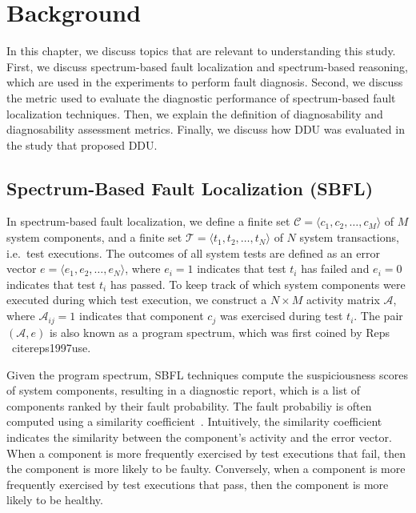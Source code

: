 \documentclass[twoside,a4paper,11pt]{memoir}
\begin{document}
\chapter{Background}%
\label{ch:background}

In this chapter, we discuss topics that are relevant to understanding this study.
First, we discuss spectrum-based fault localization and spectrum-based reasoning, which are used in the experiments to perform fault diagnosis.
Second, we discuss the metric used to evaluate the diagnostic performance of spectrum-based fault localization techniques.
Then, we explain the definition of diagnosability and diagnosability assessment metrics.
Finally, we discuss how DDU was evaluated in the study that proposed DDU\@.

\section{Spectrum-Based Fault Localization (SBFL)}
In spectrum-based fault localization, we define a finite set \(\mathcal{C} = \langle c_1, c_2, \ldots, c_M \rangle \) of \(M\) system components, and a finite set \(\mathcal{T} = \langle t_1, t_2, \ldots, t_N \rangle \) of \(N\) system transactions, i.e.\ test executions.
The outcomes of all system tests are defined as an error vector \(e = \langle e_1, e_2, \ldots, e_N \rangle \), where \(e_i = 1 \) indicates that test \(t_i \) has failed and \(e_i = 0 \) indicates that test \(t_i \) has passed.
To keep track of which system components were executed during which test execution, we construct a \(N \times M \) activity matrix \(\mathcal{A} \), where \(\mathcal{A}_{ij} = 1 \) indicates that component \(c_j \) was exercised during test \(t_i \).
The pair \((\mathcal{A}, e) \) is also known as a program spectrum, which was first coined by Reps \etal~cite{reps1997use}.

Given the program spectrum, SBFL techniques compute the suspiciousness scores of system components, resulting in a diagnostic report, which is a list of components ranked by their fault probability.
The fault probabiliy is often computed using a similarity coefficient~\cite{Jones_visualizationfor, 4041886, Naish:2011:MSS:2000791.2000795, 6651713, 5772029, ERICWONG2010188, 6058639}.
Intuitively, the similarity coefficient indicates the similarity between the component's activity and the error vector.
When a component is more frequently exercised by test executions that fail, then the component is more likely to be faulty.
Conversely, when a component is more frequently exercised by test executions that pass, then the component is more likely to be healthy.
\end{document}
